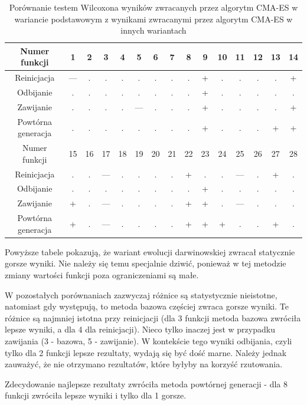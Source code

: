\documentclass{mini}
\begin{document}
\begin{table}[H]
\begin{tabular}{|c|c|c|c|c|c|c|c|c|c|c|c|c|c|c|} \hline
Numer funkcji & 1 & 2 & 3 & 4 & 5 & 6 & 7 & 8 & 9 & 10 & 11 & 12 & 13 & 14 \\ \hline
Reinicjacja & --- & . & . & . & . & . & . & . & + & . & . & . & . & + \\ \hline
Odbijanie & . & . & . & . & . & . & . & . & + & . & . & . & . & . \\ \hline
Zawijanie & . & . & . & . & --- & . & . & . & + & . & . & . & . & + \\ \hline
Powtórna generacja & . & . & . & . & . & . & . & . & + & . & . & . & + & + \\ \hline \hline
Numer funkcji & 15 & 16 & 17 & 18 & 19 & 20 & 21 & 22 & 23 & 24 & 25 & 26 & 27 & 28 \\ \hline
Reinicjacja & . & . & --- & . & . & . & . & + & . & . & --- & . & + & . \\ \hline
Odbijanie & . & . & . & . & . & . & . & . & + & . & . & . & . & . \\ \hline
Zawijanie & + & . & --- & . & . & . & . & + & + & . & --- & . & . & . \\ \hline
Powtórna generacja & + & . & --- & . & . & . & . & + & + & + & . & . & + & . \\ \hline
\end{tabular} 
\caption{Porównanie testem Wilcoxona wyników zwracanych przez algorytm CMA-ES w wariancie podstawowym z wynikami zwracanymi przez algorytm CMA-ES w innych wariantach}
\end{table}

Powyższe tabele pokazują, że wariant ewolucji darwinowskiej zwracał statycznie gorsze wyniki. Nie należy się temu specjalnie dziwić, ponieważ w tej metodzie zmiany wartości funkcji poza ograniczeniami są małe.

W pozostałych porównaniach zazwyczaj różnice są statystycznie nieistotne, natomiast gdy występują, to metoda bazowa częściej zwraca gorsze wyniki. Te różnice są najmniej istotna przy reinicjacji (dla 3 funkcji metoda bazowa zwróciła lepsze wyniki, a dla 4 dla reinicjacji). Nieco tylko inaczej jest w przypadku zawijania (3 - bazowa, 5 - zawijanie). W kontekście tego wyniki odbijania, czyli tylko dla 2 funkcji lepsze rezultaty, wydają się być dość marne. Należy jednak zauważyć, że nie otrzymano rezultatów, które byłyby na korzyść rzutowania.

Zdecydowanie najlepsze rezultaty zwróciła metoda powtórnej generacji - dla 8 funkcji zwróciła lepsze wyniki i tylko dla 1 gorsze.
\end{document}
